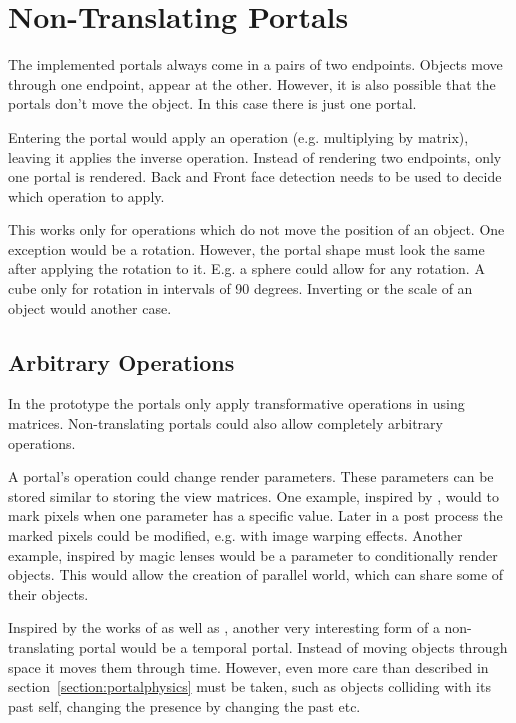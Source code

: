 \section{Non-Translating Portals}
The implemented portals always come in a pairs of two \glspl{endpoint}. Objects move through one endpoint, appear at the other. However, it is also possible that the portals don't move the object. In this case there is just one portal.

Entering the portal would apply an operation (e.g. multiplying by matrix), leaving it applies the inverse operation. Instead of rendering two \glspl{endpoint}, only one portal is rendered. Back and Front face detection needs to be used to decide which operation to apply.

This works only for operations which do not move the position of an object. One exception would be a rotation. However, the portal shape must look the same after applying the rotation to it. E.g. a sphere could allow for any rotation. A cube only for rotation in intervals of 90 degrees. Inverting or the scale of an object would another case.



\subsection{Arbitrary Operations}

In the prototype the portals only apply transformative operations in using matrices. Non-translating portals could also allow completely arbitrary operations.

A portal's operation could change render parameters. These parameters can be stored similar to storing the view matrices. One example, inspired by \textcite{borst:2009:real}, would to mark pixels when one parameter has a specific value. Later in a post process the marked pixels could be modified, e.g. with image warping effects. Another example, inspired by magic lenses would be a parameter to conditionally render objects. This would allow the creation of parallel world, which can share some of their objects.

Inspired by the works of \textcite{ryall:2005:temporal} as well as \textcite{tiesel:2009:composable}, another very interesting form of a non-translating portal would be a temporal portal. Instead of moving objects through space it moves them through time. However, even more care than described in section~\ref{section:portalphysics} must be taken, such as objects colliding with its past self, changing the presence by changing the past etc.


